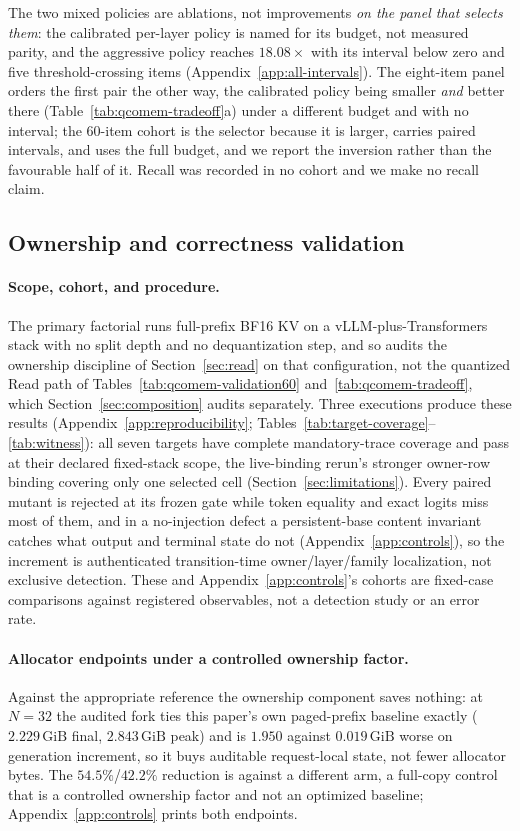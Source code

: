 \documentclass{article}
\newcommand{\gib}{\,\mathrm{GiB}}
\begin{document}
The two mixed policies are ablations, not improvements \emph{on the panel that
selects them}: the calibrated per-layer policy is named for its budget, not
measured parity, and the aggressive policy reaches $18.08\times$ with its
interval below zero and five threshold-crossing items
(Appendix~\ref{app:all-intervals}).  The eight-item panel orders the first pair
the other way, the calibrated policy being smaller \emph{and} better there
(Table~\ref{tab:qcomem-tradeoff}a) under a different budget and with no
interval; the 60-item cohort is the selector because it is larger,
carries paired intervals, and uses the full budget, and we report the inversion
rather than the favourable half of it.  Recall was recorded in no cohort and we
make no recall claim.

\subsection{Ownership and correctness validation}
\label{sec:correctness}
\label{sec:results}

\paragraph{Scope, cohort, and procedure.} \label{sec:target-status} The primary
factorial runs full-prefix BF16 KV on a vLLM-plus-Transformers stack with no
split depth and no dequantization step, and so audits the ownership discipline
of Section~\ref{sec:read} on that configuration, not the quantized Read path of
Tables~\ref{tab:qcomem-validation60} and~\ref{tab:qcomem-tradeoff}, which
Section~\ref{sec:composition} audits separately.  Three executions produce these
results (Appendix~\ref{app:reproducibility};
Tables~\ref{tab:target-coverage}--\ref{tab:witness}): all seven targets have
complete mandatory-trace coverage and pass at their declared fixed-stack scope,
the live-binding rerun's stronger owner-row binding covering only one selected
cell (Section~\ref{sec:limitations}).  Every paired mutant is rejected
at its frozen gate while token equality and exact logits miss most of them, and
in a no-injection defect a persistent-base content invariant catches what output
and terminal state do not (Appendix~\ref{app:controls}), so the increment is
authenticated transition-time owner/layer/family localization, not exclusive
detection.  These and Appendix~\ref{app:controls}'s cohorts are fixed-case
comparisons against registered observables, not a detection study or an error
rate.

\paragraph{Allocator endpoints under a controlled ownership factor.}
Against the appropriate reference the ownership component saves nothing: at
$N=32$ the audited fork ties this paper's own paged-prefix baseline exactly
($2.229\gib$ final, $2.843\gib$ peak) and is $1.950$ against $0.019\gib$ worse on
generation increment, so it buys auditable request-local state, not fewer
allocator bytes.  The $54.5\%$/$42.2\%$ reduction is against a different arm, a
full-copy control that is a controlled ownership factor and not an optimized
baseline; Appendix~\ref{app:controls} prints both endpoints.
\end{document}
